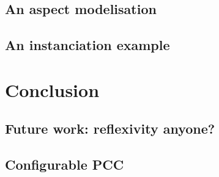 \documentclass[draft]{llncs}
\begin{document}
\subsection{An aspect modelisation}
\subsection{An instanciation example}
\section{Conclusion}
\subsection{Future work: reflexivity anyone?}
\subsection{Configurable PCC}
%
%




%
\end{document}
